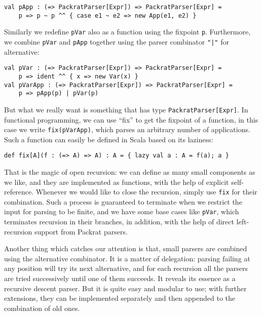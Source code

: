 \begin{lstlisting}
val pApp : (=> PackratParser[Expr]) => PackratParser[Expr] =
    p => p ~ p ^^ { case e1 ~ e2 => new App(e1, e2) }
\end{lstlisting}
Similarly we redefine \lstinline{pVar} also as a function using the fixpoint \lstinline{p}. Furthermore, we combine \lstinline{pVar} and \lstinline{pApp} together using the parser combinator \lstinline{"|"} for alternative:
 \begin{lstlisting}
val pVar : (=> PackratParser[Expr]) => PackratParser[Expr] =
    p => ident ^^ { x => new Var(x) }
val pVarApp : (=> PackratParser[Expr]) => PackratParser[Expr] =
    p => pApp(p) | pVar(p)
\end{lstlisting}
But what we really want is something that has type \lstinline{PackratParser[Expr]}. In functional programming, we can use ``fix'' to get the fixpoint of a function, in this case we write \lstinline{fix(pVarApp)}, which parses an arbitrary number of applications. Such a function can easily be defined
in Scala based on its laziness:
\begin{lstlisting}
def fix[A](f : (=> A) => A) : A = { lazy val a : A = f(a); a }
\end{lstlisting}
That is the magic of open recursion: we can define as many small components as we like, and they are implemented as functions, with the help of explicit self-reference. Whenever we would like to close the recursion, simply use \lstinline{fix} for their combination. Such a process is guaranteed to terminate when we restrict the input for parsing to be finite, and we have some base cases like \lstinline{pVar}, which terminates recursion in their branches, in addition, with the help of direct left-recursion support from Packrat parsers.

Another thing which catches our attention is that, small parsers are combined using the alternative combinator. It is a matter of delegation: parsing failing at any position will try its next alternative, and for each recursion all the parsers are tried successively until one of them succeeds. It reveals its essence as a recursive descent parser. But it is quite easy and modular to use; with further extensions, they can be implemented separately and then appended to the combination of old ones.
